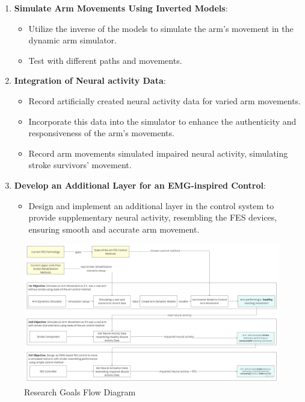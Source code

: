 \begin{enumerate}
    \item \textbf{Simulate Arm Movements Using Inverted Models}:
    \begin{itemize}
        \item Utilize the inverse of the models to simulate the arm's movement in the dynamic arm simulator.
        \item Test with different paths and movements.
    \end{itemize}
    
    \item \textbf{Integration of Neural activity Data}:
    \begin{itemize}
        \item Record artificially created neural activity data for varied arm movements.
        \item Incorporate this data into the simulator to enhance the authenticity and responsiveness of the arm's movements.
        \item Record arm movements simulated impaired neural activity, simulating stroke survivors' movement.
    \end{itemize}
    
    \item \textbf{Develop an Additional Layer for an EMG-inspired Control}:
    \begin{itemize}
        \item Design and implement an additional layer in the control system to provide supplementary neural activity, resembling the FES devices, ensuring smooth and accurate arm movement.
    \end{itemize}
\end{enumerate}


\begin{figure}[h!]
    \centering
    \includegraphics[width=\textwidth]{Pictures/ResearchGoals.jpg}
    \caption{Research Goals Flow Diagram }
    \label{fig:researchgoals}
\end{figure}


